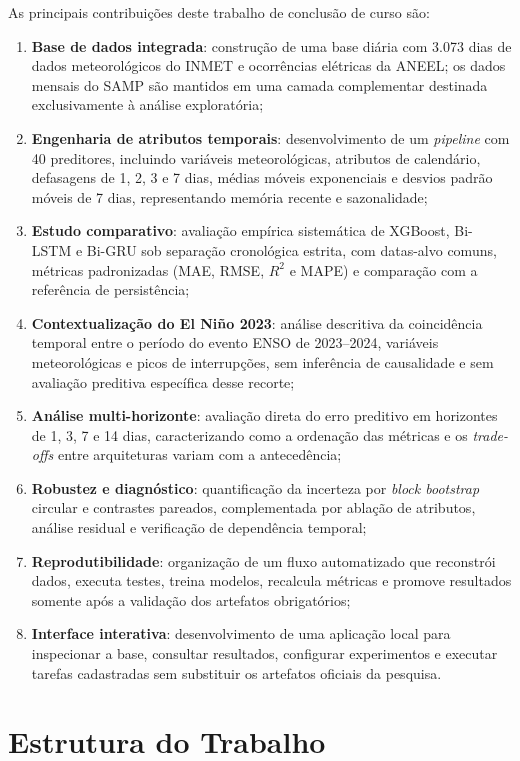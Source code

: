 As principais contribuições deste trabalho de conclusão de curso são:
\begin{enumerate}
    \item \textbf{Base de dados integrada}: construção de uma base diária com 3.073 dias de dados meteorológicos do INMET e ocorrências elétricas da ANEEL; os dados mensais do SAMP são mantidos em uma camada complementar destinada exclusivamente à análise exploratória;
    \item \textbf{Engenharia de atributos temporais}: desenvolvimento de um \textit{pipeline} com 40 preditores, incluindo variáveis meteorológicas, atributos de calendário, defasagens de 1, 2, 3 e 7 dias, médias móveis exponenciais e desvios padrão móveis de 7 dias, representando memória recente e sazonalidade;
    \item \textbf{Estudo comparativo}: avaliação empírica sistemática de XGBoost, Bi-LSTM e Bi-GRU sob separação cronológica estrita, com datas-alvo comuns, métricas padronizadas (MAE, RMSE, $R^2$ e MAPE) e comparação com a referência de persistência;
    \item \textbf{Contextualização do El Niño 2023}: análise descritiva da coincidência temporal entre o período do evento ENSO de 2023--2024, variáveis meteorológicas e picos de interrupções, sem inferência de causalidade e sem avaliação preditiva específica desse recorte;
    \item \textbf{Análise multi-horizonte}: avaliação direta do erro preditivo em horizontes de 1, 3, 7 e 14 dias, caracterizando como a ordenação das métricas e os \textit{trade-offs} entre arquiteturas variam com a antecedência;
    \item \textbf{Robustez e diagnóstico}: quantificação da incerteza por \textit{block bootstrap} circular e contrastes pareados, complementada por ablação de atributos, análise residual e verificação de dependência temporal;
    \item \textbf{Reprodutibilidade}: organização de um fluxo automatizado que reconstrói dados, executa testes, treina modelos, recalcula métricas e promove resultados somente após a validação dos artefatos obrigatórios;
    \item \textbf{Interface interativa}: desenvolvimento de uma aplicação local para inspecionar a base, consultar resultados, configurar experimentos e executar tarefas cadastradas sem substituir os artefatos oficiais da pesquisa.
\end{enumerate}

\section{Estrutura do Trabalho}\label{sec:estrutura}

